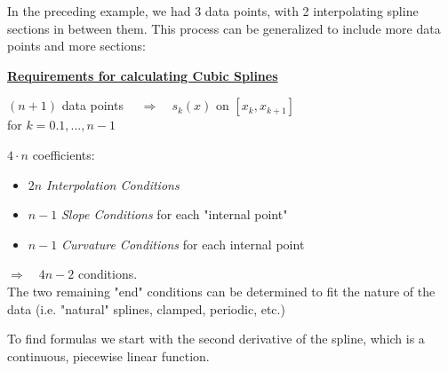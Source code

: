 \documentclass[a4paper,12pt]{report}
\begin{document}

\pagebreak
	In the preceding example, we had 3 data points, with 2 interpolating spline sections in between them.  This process can be generalized to include 
	more data points and more sections:

	\begin{center}
	\fbox
	{
		\parbox{0.8\textwidth}
		{
		\noindent \textbf{\underline{Requirements for calculating Cubic Splines}}
			\begin{center}
				$(n+1)$ data points $\quad \Rightarrow \quad s_k(x)$ on $[x_k, x_{k+1}]$\\
				\medskip
				for $k = 0. 1, ..., n\!-\!1$
			\end{center}
			\noindent $4\cdot n$ coefficients:
			\begin{itemize}
				\item $2n$ \textit{Interpolation Conditions}
				\item $n-1$ \textit{Slope Conditions} for each "internal point"
				\item $n-1$ \textit{Curvature Conditions} for each internal point
			\end{itemize}
			$\Rightarrow \quad 4n - 2$ conditions.\\

			The two remaining "end" conditions can be determined to fit the nature of the data (i.e. "natural" splines, clamped, periodic, etc.)
		}
	}
	\end{center}
	\bigskip

	To find formulas we start with the second derivative of the spline, which is a continuous, piecewise linear function.
\end{document}
